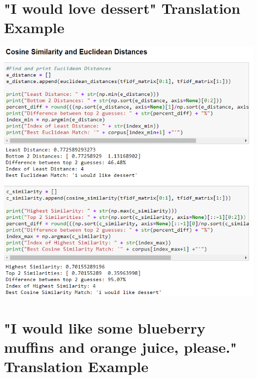 \documentclass[runningheads]{llncs}
\begin{document}
\section{"I would love dessert" Translation Example}
\hypertarget{Appendix E}{}

	\begin{minipage}{\linewidth}
		\begin{center}
			\includegraphics[width=\linewidth]{Dessert_Comparison.png}
			\label{fig:Sentence Comparison 2}
			\vspace*{1cm}
		\end{center}
	\end{minipage}
	\afterpage{\clearpage}


\section{"I would like some blueberry muffins and orange juice, please." Translation Example}
\hypertarget{Appendix F}{}
\end{document}
